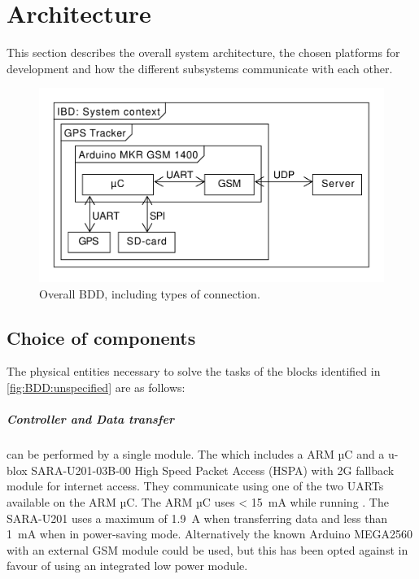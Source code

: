 
\chapter{Architecture}
\label{sec:Architecture}
This section describes the overall system architecture, the chosen platforms for development and how the different subsystems communicate with each other.

\begin{figure}[H]
	\centering
	\includegraphics[width=0.7\linewidth]{gfx/Design/Overall_IBD.pdf}
	\caption{Overall BDD, including types of connection.}
	\label{fig:BDD:overall}
\end{figure}

\section{Choice of components}
The physical entities necessary to solve the tasks of the blocks identified in \cref{fig:BDD:unspecified} are as follows:

\paragraph{Controller and Data transfer} can be performed by a single module. The \MKR which includes a \SAMD ARM µC and a u-blox SARA-U201-03B-00 High Speed Packet Access (HSPA) with 2G fallback module for internet access\cite{MKRGSM1400}.
They communicate using one of the two UARTs available on the \SAMD ARM µC.
The \SAMD ARM µC uses \SI{< 15}{\milli\ampere} while running \cite[p.~791-794]{SAMD21}.
The SARA-U201 uses a maximum of \SI{1.9}{\ampere} when transferring data \cite[p.~26]{SARAU201} and less than \SI{1}{\milli\ampere} when in power-saving mode. Alternatively the known Arduino MEGA2560 with an external GSM module could be used, but this has been opted against in favour of using an integrated low power module.

